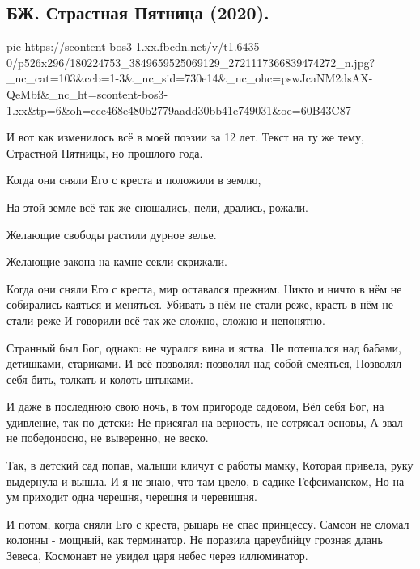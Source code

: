  
 
 
 
 
\subsection{БЖ. Страстная Пятница (2020).}


\ifcmt
  pic https://scontent-bos3-1.xx.fbcdn.net/v/t1.6435-0/p526x296/180224753_3849659525069129_2721117366839474272_n.jpg?_nc_cat=103&ccb=1-3&_nc_sid=730e14&_nc_ohc=pswJcaNM2dsAX-QeMbf&_nc_ht=scontent-bos3-1.xx&tp=6&oh=cce468e480b2779aadd30bb41e749031&oe=60B43C87
\fi


И вот как изменилось всё в моей поэзии за 12 лет. Текст на ту же тему, Страстной Пятницы, но прошлого года.

Когда они сняли Его с креста и положили в землю,

На этой земле всё так же сношались, пели, дрались, рожали.

Желающие свободы растили дурное зелье.

Желающие закона на камне секли скрижали.

Когда они сняли Его с креста, мир оставался прежним.
Никто и ничто в нём не собирались каяться и меняться.
Убивать в нём не стали реже, красть в нём не стали реже
И говорили всё так же сложно, сложно и непонятно.

Странный был Бог, однако: не чурался вина и яства.
Не потешался над бабами, детишками, стариками.
И всё позволял: позволял над собой смеяться,
Позволял себя бить, толкать и колоть штыками.

И даже в последнюю свою ночь, в том пригороде садовом,
Вёл себя Бог, на удивление, так по-детски:
Не присягал на верность, не сотрясал основы,
А звал - не победоносно, не выверенно, не веско.

Так, в детский сад попав, малыши кличут с работы мамку,
Которая привела, руку выдернула и вышла.
И я не знаю, что там цвело, в садике Гефсиманском,
Но на ум приходит одна черешня, черешня и черевишня.

И потом, когда сняли Его с креста, рыцарь не спас принцессу.
Самсон не сломал колонны - мощный, как терминатор.
Не поразила цареубийцу грозная длань Зевеса,
Космонавт не увидел царя небес через иллюминатор.

